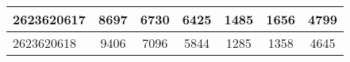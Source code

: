\begin{adjustbox}{center}
\begin{tabular}{|l||c|c|c|c|c|c|}
\hline
2623620617 & \cellcolor[RGB]{251, 218, 218} 8697 & \cellcolor[RGB]{253, 241, 241} 6730 & \cellcolor[RGB]{254, 246, 246} 6425 & \cellcolor[RGB]{223, 223, 251} 1485 & \cellcolor[RGB]{223, 223, 251} 1656 & \cellcolor[RGB]{250, 250, 254} 4799 \\
\hline
2623620618 & \cellcolor[RGB]{249, 205, 205} 9406 & \cellcolor[RGB]{252, 232, 232} 7096 & \cellcolor[RGB]{254, 246, 246} 5844 & \cellcolor[RGB]{223, 223, 251} 1285 & \cellcolor[RGB]{223, 223, 251} 1358 & \cellcolor[RGB]{250, 250, 254} 4645 \\
\hline
\end{tabular}
\end{adjustbox}
